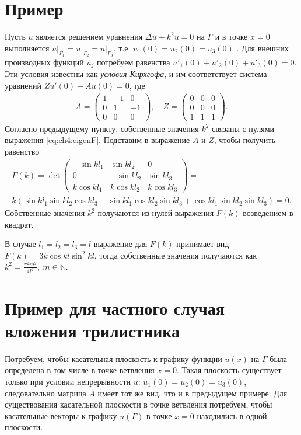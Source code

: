 \section{Пример}\label{sec:ch4/sect3/subsect1}
Пусть $u$ является решением уравнения $\Delta u + k^2 u =0 $ на  $\Gamma$ и в точке $x=0$ выполняется $\left. u \right|_{\Gamma_1} = \left. u \right|_{\Gamma_2} = \left. u \right|_{\Gamma_3}$, т.е. $u_1(0) = u_2(0) = u_3(0)$ . Для внешних производных функций $u_j$ потребуем равенства $u'_1(0) + u'_2(0) + u'_3(0)=0$. Эти  условия известны как \textit{ условия Кирхгофа}, и им соответствует система уравнений $Z u'(0) + A u(0) =0$, где 
\[
\begin{array}{cc}
A = \begin{pmatrix}
1		& -1 			& 0 \\ 
0 		& 1		  	& -1 \\ 
0		& 0			& 0
\end{pmatrix} , \quad
Z = \begin{pmatrix}
0		& 0			& 0 \\
0		& 0			& 0 \\
1		& 1			& 1
\end{pmatrix} .
\end{array}
\]
Согласно предыдущему пункту, собственные значения $k^2$ связаны с нулями выражения
\eqref{eq:ch4:eigenF}. Подставим в выражение $A$ и $Z$, чтобы получить равенство
\begin{multline*}
F(k) = \det \begin{pmatrix}
-\sin{k l_1}			& \sin{k l_2} 			& 0 \\ 
0 				& -\sin{k l_2}		  	& \sin{k l_3} \\ 
k \cos{k l_1}		& k \cos{k l_2}			& k \cos{k l_3}
\end{pmatrix} = \\ k \left( \sin {k l_1} \sin{k l_2} \cos{k l_3} + \sin{k l_1} \cos{k l_2} \sin{k l_3} + \cos{k l_1} \sin{k l_2}  \sin{k l_3} \right) = 0.
\end{multline*}
Собственные значения $k^2$ получаются из нулей выражения $F(k)$ возведением в квадрат.

В случае $l_1=l_2=l_3=l$ выражение для $F(k)$ принимает вид $F(k) = 3 k \cos{k l} \sin^2 k l$, тогда собственные значения получаются как 
$ k^2 = \frac{ \pi^2 m^2}{4l^2},   \ m \in \mathbb{N}.$

\section{Пример для частного случая вложения трилистника}\label{sec:ch4/sect3/subsect2}
Потребуем, чтобы касательная плоскость к графику функции $u(x)$ на $\Gamma$ была определена в том числе в точке ветвления $x=0$. 
Такая плоскость существует только при условии непрерывности $u$: $u_1(0)=u_2(0)=u_3(0)$, следовательно матрица $A$ имеет тот же вид, что и в предыдущем примере.
Для существования касательной плоскости в точке ветвления потребуем, чтобы касательные векторы к графику $u(\Gamma)$ в точке $x=0$ находились в одной плоскости.

